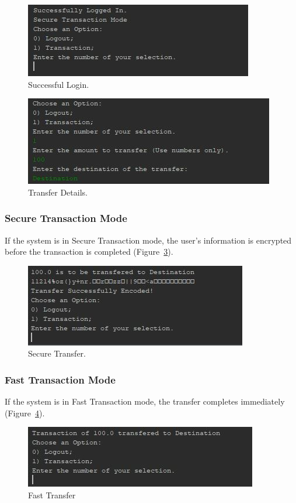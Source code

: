 \documentclass[12pt,twocolumn]{IEEEtran}
\begin{document}
\begin{figure}[h!]
	\centering
	\includegraphics[width=0.4\linewidth]{./Resources/cli-loginSuccess.jpg}
	\caption{Successful Login.} \label{fig:menu}
\end{figure}


\begin{figure}[h!]
	\centering
	\includegraphics[width=0.4\linewidth]{./Resources/cli-details.jpg}
	\caption{Transfer Details.} \label{fig:transfer}
\end{figure}

\subsubsection{Secure Transaction Mode}

If the system is in Secure Transaction mode, the user's information is encrypted before the transaction is completed (Figure~\ref{fig:secure}).

\begin{figure}[h!]
	\centering
	\includegraphics[width=0.4\linewidth]{./Resources/cli-secure.jpg}
	\caption{Secure Transfer.} \label{fig:secure}
\end{figure}

\subsubsection{Fast Transaction Mode}

If the system is in Fast Transaction mode, the transfer completes immediately (Figure~\ref{fig:fast}).

\begin{figure}[h!]
	\centering
	\includegraphics[width=0.4\linewidth]{./Resources/cli-fast.jpg}
	\caption{Fast Transfer} \label{fig:fast}
\end{figure}
\end{document}
